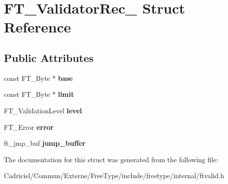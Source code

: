 \hypertarget{struct_f_t___validator_rec__}{\section{F\-T\-\_\-\-Validator\-Rec\-\_\- Struct Reference}
\label{struct_f_t___validator_rec__}
}
\subsection*{Public Attributes}
\begin{DoxyCompactItemize}
\item 
\hypertarget{struct_f_t___validator_rec___a62de459b75acae3e1695b3d6600ca22f}{const F\-T\-\_\-\-Byte $\ast$ {\bfseries base}}\label{struct_f_t___validator_rec___a62de459b75acae3e1695b3d6600ca22f}

\item 
\hypertarget{struct_f_t___validator_rec___acc4d58a3e46d2b7c92bb51c3ddd8d331}{const F\-T\-\_\-\-Byte $\ast$ {\bfseries limit}}\label{struct_f_t___validator_rec___acc4d58a3e46d2b7c92bb51c3ddd8d331}

\item 
\hypertarget{struct_f_t___validator_rec___aa70830280c76507b8b06e616da8cb545}{F\-T\-\_\-\-Validation\-Level {\bfseries level}}\label{struct_f_t___validator_rec___aa70830280c76507b8b06e616da8cb545}

\item 
\hypertarget{struct_f_t___validator_rec___ab12d54f54a55a90ce19761a1c24e28f0}{F\-T\-\_\-\-Error {\bfseries error}}\label{struct_f_t___validator_rec___ab12d54f54a55a90ce19761a1c24e28f0}

\item 
\hypertarget{struct_f_t___validator_rec___aa0b346f9ef78939e93c85389aa2b54b3}{ft\-\_\-jmp\-\_\-buf {\bfseries jump\-\_\-buffer}}\label{struct_f_t___validator_rec___aa0b346f9ef78939e93c85389aa2b54b3}

\end{DoxyCompactItemize}


The documentation for this struct was generated from the following file\-:\begin{DoxyCompactItemize}
\item 
Cadriciel/\-Commun/\-Externe/\-Free\-Type/include/freetype/internal/ftvalid.\-h\end{DoxyCompactItemize}
